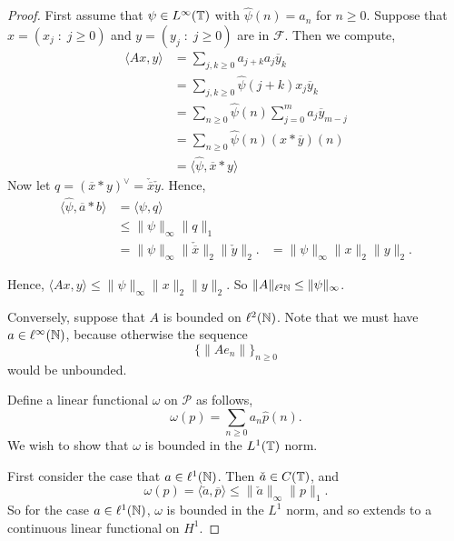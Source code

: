 \documentclass{unswmaths}
\begin{document}
    \begin{proof}
        First assume that $\psi \in L^\infty(\mathbb{T})$ with $\hat{\psi}(n) = a_n$ for $n\geq 0$.
        Suppose that $x = (x_j\;:\;j\geq 0)$ and $y = (y_j\;:\;j\geq 0)$ are in $\mathcal{F}$.
        Then we compute,
        \begin{align*}
            \langle Ax,y \rangle &= \sum_{j,k\geq 0} a_{j+k}a_j\overline{y}_k\\
            &= \sum_{j,k\geq 0} \hat{\psi}(j+k)x_j\overline{y}_k\\
            &= \sum_{n \geq 0} \hat{\psi}(n)\sum_{j = 0}^m a_j\overline{y}_{m-j}\\
            &= \sum_{n\geq 0} \hat{\psi}(n) (x * \overline{y})(n)\\
            &= \langle \hat{\psi},\overline{x}*y\rangle
        \end{align*}
        Now let $q = (\overline{x}*y)^{\vee} = \check{\overline{x}} \check{y}$. Hence,
        \begin{align*}
            \langle \hat{\psi},\overline{a}*b\rangle &= \langle \psi,q\rangle\\
            &\leq \|\psi\|_{\infty} \|q\|_1\\
            &= \|\psi\|_\infty \|\check{\overline{x}}\|_2\|\check{y}\|_2.
            &= \|\psi\|_\infty \|{x}\|_2\|y\|_2.
        \end{align*}
        
        Hence, $\langle Ax,y\rangle \leq \|\psi\|_\infty \|x\|_2\|y\|_2$. So $\|A\|_{\ell^2{\mathbb{N}}} \leq \|\psi\|_\infty$.
        
        Conversely, suppose that $A$ is bounded on $\ell^2(\mathbb{N})$. 
        Note that we must have $a \in \ell^{\infty}(\mathbb{N})$, because otherwise
        the sequence 
        \begin{equation*}
            \{\|Ae_n\|\}_{n \geq 0}
        \end{equation*}
        would be unbounded.
        
        Define a linear functional $\omega$ on $\mathcal{P}$ as follows,
        \begin{equation*}
            \omega(p) = \sum_{n\geq 0} a_n \hat{p}(n).
        \end{equation*}
        We wish to show that $\omega$ is bounded in the $L^1(\mathbb{T})$ norm. 
        
        First consider the case that $a \in \ell^1(\mathbb{N})$. Then $\check{a} \in C(\mathbb{T})$,
        and
        \begin{equation*}
            \omega(p) = \langle \check{a},\overline{p}\rangle \leq \|\check{a}\|_{\infty}\|p\|_1.
        \end{equation*}
        So for the case $a \in \ell^1(\mathbb{N})$, $\omega$ is bounded in the $L^1$ norm,
        and so extends to a continuous linear functional on $H^1$.
        

\end{proof}
\end{document}
